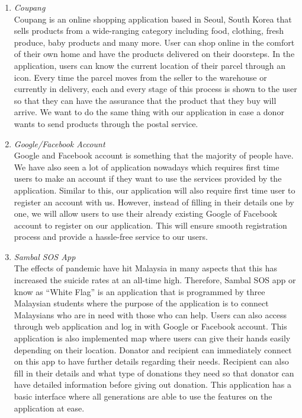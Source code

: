 \documentclass[conference]{IEEEtran}
\begin{document}
\begin{enumerate}
\item \textit{Coupang }\\
Coupang is an online shopping application based in Seoul, South Korea that sells products from a wide-ranging category including food, clothing, fresh produce, baby products and many more. User can shop online in the comfort of their own home and have the products delivered on their doorsteps. In the application, users can know the current location of their parcel through an icon. Every time the parcel moves from the seller to the warehouse or currently in delivery, each and every stage of this process is shown to the user so that they can have the assurance that the product that they buy will arrive. We want to do the same thing with our application in case a donor wants to send products through the postal service. \\
\item \textit{Google/Facebook Account}\\
Google and Facebook account is something that the majority of people have. We have also seen a lot of application nowadays which requires first time users to make an account if they want to use the services provided by the application. Similar to this, our application will also require first time user to register an account with us. However, instead of filling in their details one by one, we will allow users to use their already existing Google of Facebook account to register on our application. This will ensure smooth registration process and provide a hassle-free service to our users.\\
\item \textit{Sambal SOS App} \\
The effects of pandemic have hit Malaysia in many aspects that this has increased the suicide rates at an all-time high. Therefore, Sambal SOS app or know as “White Flag” is an application that is programmed by three Malaysian students where the purpose of the application is to connect Malaysians who are in need with those who can help. Users can also access through web application and log in with Google or Facebook account. This application is also implemented map where users can give their hands easily depending on their location. Donator and recipient can immediately connect on this app to have further details regarding their needs. Recipient can also fill in their details and what type of donations they need so that donator can have detailed information before giving out donation.  This application has a basic interface where all generations are able to use the features on the application at ease. \\

\end{enumerate}
\end{document}
